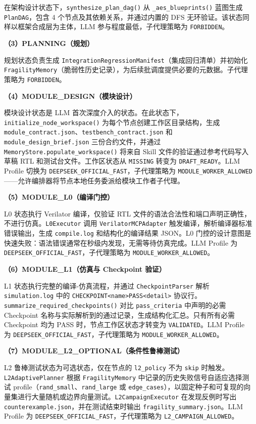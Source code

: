 在架构设计状态下，\texttt{synthesize\_plan\_dag()} 从
\texttt{\_aes\_blueprints()} 蓝图生成 \texttt{PlanDAG}，包含 4
个节点及其依赖关系，并通过内置的 DFS
无环验证。该状态同样以框架合成层为主体，LLM 参与程度最低，子代理策略为
\texttt{FORBIDDEN}。

\textbf{（3）PLANNING（规划）}

规划状态负责生成
\texttt{IntegrationRegressionManifest}（集成回归清单）并初始化
\texttt{FragilityMemory}（脆弱性历史记录），为后续批调度提供必要的元数据。子代理策略为
\texttt{FORBIDDEN}。

\textbf{（4）MODULE\_DESIGN（模块设计）}

模块设计状态是 LLM
首次深度介入的状态。在此状态下，\texttt{initialize\_node\_workspace()}
为每个节点创建工作区目录结构，生成
\texttt{module\_contract.json}、\texttt{testbench\_contract.json} 和
\texttt{module\_design\_brief.json} 三份合约文件，并通过
\texttt{MemoryStore.populate\_workspace()} 将来自 Skill
文件的验证通过参考代码写入草稿 RTL 和测试台文件。工作区状态从
\texttt{MISSING} 转变为 \texttt{DRAFT\_READY}。LLM Profile 切换为
\texttt{DEEPSEEK\_OFFICIAL\_FAST}，子代理策略为
\texttt{MODULE\_WORKER\_ALLOWED}------允许编排器将节点本地任务委派给模块工作者子代理。

\textbf{（5）MODULE\_L0（编译门控）}

L0 状态执行 Verilator 编译，仅验证 RTL
文件的语法合法性和端口声明正确性，不进行仿真。\texttt{L0Executor} 调用
\texttt{VerilatorMCPAdapter} 触发编译，解析编译器标准错误输出，生成
\texttt{compile.log} 和结构化的编译结果 JSON。L0
门控的设计意图是快速失败：语法错误通常在秒级内发现，无需等待仿真完成。LLM
Profile 为 \texttt{DEEPSEEK\_OFFICIAL\_FAST}，子代理策略为
\texttt{MODULE\_WORKER\_ALLOWED}。

\textbf{（6）MODULE\_L1（仿真与 Checkpoint 验证）}

L1 状态执行完整的编译-仿真流程，并通过 \texttt{CheckpointParser} 解析
\texttt{simulation.log} 中的
\texttt{CHECKPOINT\textbar{}\textless{}name\textgreater{}\textbar{}PASS\textbar{}\textless{}detail\textgreater{}}
协议行。\texttt{summarize\_required\_checkpoints()} 对比
\texttt{pass\_criteria} 中声明的必需 Checkpoint
名称与实际解析到的通过记录，生成结构化汇总。只有所有必需 Checkpoint 均为
PASS 时，节点工作区状态才转变为 \texttt{VALIDATED}。LLM Profile 为
\texttt{DEEPSEEK\_OFFICIAL\_FAST}，子代理策略为
\texttt{MODULE\_WORKER\_ALLOWED}。

\textbf{（7）MODULE\_L2\_OPTIONAL（条件性鲁棒测试）}

L2 鲁棒测试状态为可选状态，仅在节点的 \texttt{l2\_policy} 不为
\texttt{skip} 时触发。\texttt{L2AdaptivePlanner} 根据
\texttt{FragilityMemory} 中记录的历史失败信号自适应选择测试
profile（\texttt{rand\_small}、\texttt{rand\_large} 或
\texttt{edge\_cases}），以固定种子和可复现的向量集进行大量随机或边界向量测试。\texttt{L2CampaignExecutor}
在发现反例时写出 \texttt{counterexample.json}，并在测试结束时输出
\texttt{fragility\_summary.json}。LLM Profile 为
\texttt{DEEPSEEK\_OFFICIAL\_FAST}，子代理策略为
\texttt{L2\_CAMPAIGN\_ALLOWED}。

